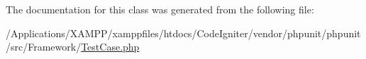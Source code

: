 The documentation for this class was generated from the following file\+:\begin{DoxyCompactItemize}
\item 
/\+Applications/\+X\+A\+M\+P\+P/xamppfiles/htdocs/\+Code\+Igniter/vendor/phpunit/phpunit/src/\+Framework/\mbox{\hyperlink{phpunit_2src_2_framework_2_test_case_8php}{Test\+Case.\+php}}\end{DoxyCompactItemize}
